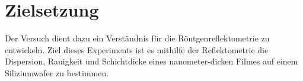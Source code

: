 \section{Zielsetzung}
\label{sec:Zielsetzung}

Der Versuch dient dazu ein Verständnis für die Röntgenreflektometrie zu entwickeln.
Ziel dieses Experiments ist es mithilfe der Reflektometrie die Dispersion, Rauigkeit und Schichtdicke eines nanometer-dicken Filmes auf einem Siliziumwafer zu bestimmen. 